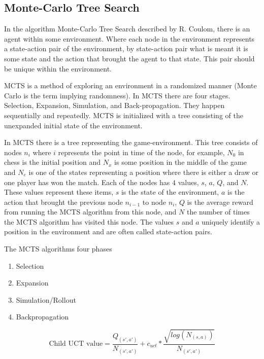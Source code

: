 \subsection{Monte-Carlo Tree Search}

\label{sec:mcts}

In the algorithm Monte-Carlo Tree Search described by R. Coulom\cite{mcts:coulom}, there is an agent within some environment. Where each node in the environment represents a state-action pair of the environment, by state-action pair what is meant it is some state and the action that brought the agent to that state. This pair should be unique within the environment.

MCTS is a method of exploring an environment in a randomized manner (Monte Carlo is the term implying randomness). In MCTS there are four stages. Selection, Expansion, Simulation, and Back-propagation. They happen sequentially and repeatedly. MCTS is initialized with a tree consisting of the unexpanded initial state of the environment.

In MCTS there is a tree representing the game-environment. This tree consists of nodes $n_i$ where $i$ represents the point in time of the node, for example, $N_0$ in chess is the initial position and $N_x$ is some position in the middle of the game and $N_e$ is one of the states representing a position where there is either a draw or one player has won the match. Each of the nodes has $4$ values, $s$, $a$, $Q$, and $N$. These values represent these items, $s$ is the state of the environment, $a$ is the action that brought the previous node $n_{i-1}$ to node $n_i$, $Q$ is the average reward from running the MCTS algorithm from this node, and $N$ the number of times the MCTS algorithm has visited this node. The values $s$ and $a$ uniquely identify a position in the environment and are often called state-action pairs.

The MCTS algorithms four phases
\begin{enumerate}
  \item Selection
  \item Expansion
  \item Simulation/Rollout
  \item Backpropagation
\end{enumerate}


\begin{equation} \label{UCT_formula}
  \text{Child UCT value} = \frac{Q_{(s',a')}}{N_{(s',a')}} + c_{uct} * \frac{\sqrt{log(N_{(s,a)})}}{N_{(s',a')}}
\end{equation}

